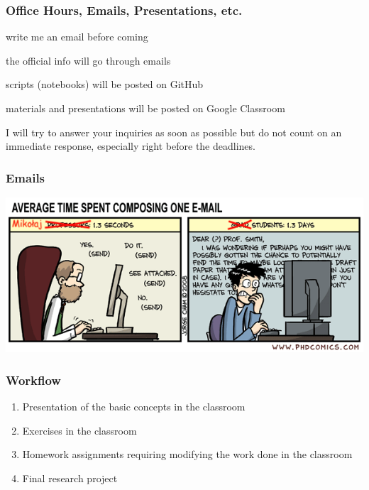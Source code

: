 \documentclass{beamer}
\begin{document}
\begin{frame}
    \frametitle{Office Hours, Emails, Presentations, etc.}
    \begin{description}
        \item [Office Hours:] write me an email before coming
        \item [Emails:] the official info will go through emails
        \item [GitHub:] scripts (notebooks) will be posted on GitHub
        \item [Google Classroom:] materials and presentations will be posted on
        Google Classroom
    \end{description}
    \alert{I will try to answer your inquiries as soon as possible but do not
    count on an immediate response, especially right before the deadlines.}
\end{frame}
\begin{frame}
    \frametitle{Emails}
        \includegraphics[width = \textwidth]{emails.png}
\end{frame}
\begin{frame}
    \frametitle{Workflow}
    \begin{enumerate}
        \item Presentation of the basic concepts in the classroom
        \item Exercises in the classroom
        \item Homework assignments requiring modifying the work done in the classroom
        \item Final research project
    \end{enumerate}
\end{frame}
\end{document}
